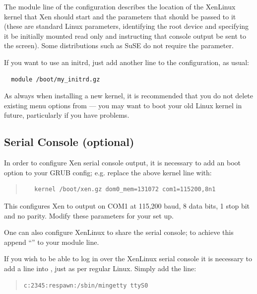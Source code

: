 \documentclass[11pt,twoside,final,openright]{report}
\begin{document}
The module line of the configuration describes the location of the
XenLinux kernel that Xen should start and the parameters that should
be passed to it (these are standard Linux parameters, identifying the
root device and specifying it be initially mounted read only and
instructing that console output be sent to the screen).  Some
distributions such as SuSE do not require the  parameter.



If you want to use an initrd, just add another  line to
the configuration, as usual:
{\small
\begin{verbatim}
  module /boot/my_initrd.gz
\end{verbatim}
}

As always when installing a new kernel, it is recommended that you do
not delete existing menu options from  --- you may want
to boot your old Linux kernel in future, particularly if you
have problems.


\subsection{Serial Console (optional)}



In order to configure Xen serial console output, it is necessary to add 
an boot option to your GRUB config; e.g. replace the above kernel line 
with: 
\begin{quote}
{\small
\begin{verbatim}
   kernel /boot/xen.gz dom0_mem=131072 com1=115200,8n1
\end{verbatim}}
\end{quote}

This configures Xen to output on COM1 at 115,200 baud, 8 data bits, 
1 stop bit and no parity. Modify these parameters for your set up. 

One can also configure XenLinux to share the serial console; to 
achieve this append ``'' to your 
module line. 


If you wish to be able to log in over the XenLinux serial console it
is necessary to add a line into , just as per 
regular Linux. Simply add the line:
\begin{quote}
{\small 
{\tt c:2345:respawn:/sbin/mingetty ttyS0}
}
\end{quote} 
\end{document}
